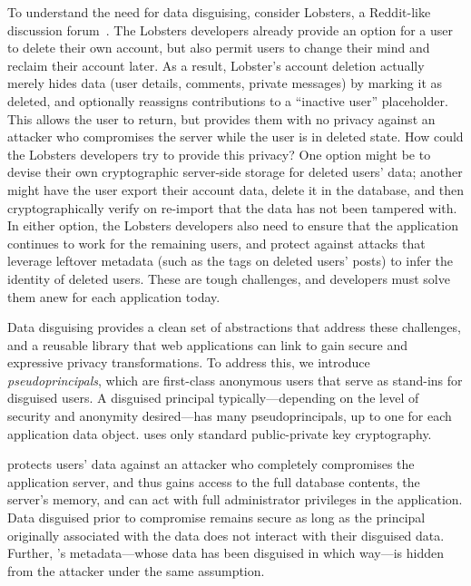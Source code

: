 %
%
To understand the need for data disguising, consider Lobsters, a Reddit-like
discussion forum~\cite{lobsters}.
%
The Lobsters developers already provide an option for a user to delete their own
account, but also permit users to change their mind and reclaim their
account later.
%
As a result, Lobster's account deletion actually merely hides data (\eg user
details, comments, private messages) by marking it as deleted, and optionally
reassigns contributions to a ``inactive user'' placeholder.
%
This allows the user to return, but provides them with no privacy against an
attacker who compromises the server while the user is in deleted state.
%
How could the Lobsters developers try to provide this privacy?
%
One option might be to devise their own cryptographic server-side storage for
deleted users' data; another might have the user export their account data,
delete it in the database, and then cryptographically verify on re-import that
the data has not been tampered with.
%
In either option, the Lobsters developers also need to ensure that the
application continues to work for the remaining users, and protect against
attacks that leverage leftover metadata (such as the tags on deleted users'
posts) to infer the identity of deleted users.
%
These are tough challenges, and developers must solve them anew for each
application today.
%

%
%
Data disguising provides a clean set of abstractions that address these
challenges, and a reusable library that web applications can link to gain
secure and expressive privacy transformations.
%
%
To address this, we introduce \emph{pseudoprincipals}, which are first-class anonymous
users that serve as stand-ins for disguised users.
%
A disguised principal typically---depending on the level of security and anonymity
desired---has many pseudoprincipals, up to one for each application data object.
%
\sys uses only standard public-private key cryptography.
%

%
%
\sys protects users' data against an attacker who completely compromises the
application server, and thus gains access to the full database contents, the server's
memory, and can act with full administrator privileges in the application.
%
Data disguised prior to compromise remains secure as long as the principal
originally associated with the data does not interact with their disguised
data.
%
Further, \sys's metadata---\eg whose data has been disguised in which way---is
hidden from the attacker under the same assumption.
%

